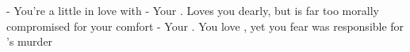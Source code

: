 \documentclass[char]{Pestilence}
\begin{document}
\begin{contacts}
	\contact{\cOutsider{}} - You're a little in love with \cOutsider{\them}
	\contact{\cElder{}} - Your \cElder{\parent}. Loves you dearly, but is far too morally compromised for your comfort
	\contact{\cApprentice{}} - Your \cApprentice{\sibling}. You love \cApprentice{\them}, yet you fear \cApprentice{\they} was responsible for \cOutsider{}'s murder

\end{contacts}
\end{document}
